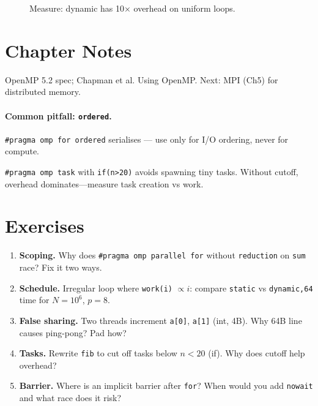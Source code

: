 \begin{figure}[h]\centering
{}
\caption{Measure: dynamic has 10× overhead on uniform loops.}
\label{fig:sched-measure}
\end{figure}



\section{Chapter Notes}
OpenMP 5.2 spec; Chapman et al. Using OpenMP. Next: MPI (Ch5) for distributed memory.


\paragraph{Common pitfall: \texttt{ordered}.} \texttt{\#pragma omp for ordered} serialises — use only for I/O ordering, never for compute.

\begin{remark} \texttt{\#pragma omp task} with \texttt{if(n>20)} avoids spawning tiny tasks. Without cutoff, overhead dominates—measure task creation vs work.
\end{remark}


\section{Exercises}
\begin{enumerate}[label=E4.\arabic*, leftmargin=*, itemsep=0.6em]
    \item \textbf{Scoping.} Why does \texttt{\#pragma omp parallel for} without \texttt{reduction} on \texttt{sum} race? Fix it two ways.
    \item \textbf{Schedule.} Irregular loop where \texttt{work(i)} $\propto i$: compare \texttt{static} vs \texttt{dynamic,64} time for $N=10^6$, $p=8$.
    \item \textbf{False sharing.} Two threads increment \texttt{a[0]}, \texttt{a[1]} (int, 4B). Why 64B line causes ping-pong? Pad how?
    \item \textbf{Tasks.} Rewrite \texttt{fib} to cut off tasks below $n<20$ (if). Why does cutoff help overhead?
    \item \textbf{Barrier.} Where is an implicit barrier after \texttt{for}? When would you add \texttt{nowait} and what race does it risk?
\end{enumerate}

